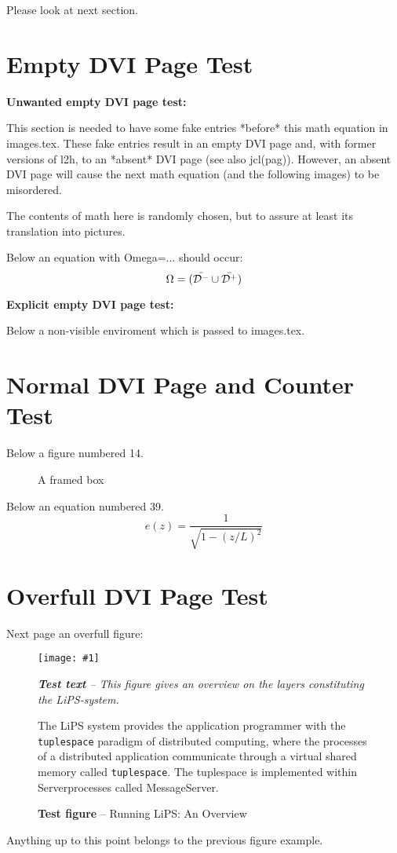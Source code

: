 \documentclass[12pt]{article}
\newcommand{\postscript}[3]{\begin{figure}[ht]%
  \begin{center}\texttt{[image: \#1]}\leavevmode
  \caption{#2}\label{#1}{\em #3}\end{center}\end{figure}}
\begin{document}
Please look at next section.

\section{Empty DVI Page Test}

{\bf Unwanted empty DVI page test:}

This section is needed to have some fake entries *before*
this math equation in images.tex. These fake entries result in an
empty DVI page and, with former versions of l2h, to an *absent*
DVI page (see also jcl(pag)).
However, an absent DVI page will cause the next math equation
(and the following images) to be misordered.

The contents of math here is randomly chosen, but to assure at
least its translation into pictures.

Below an equation with Omega=... should occur:
$$\Omega=(\bar{{\cal D}^-}\cup\bar{{\cal D}^+})$$

{\bf Explicit empty DVI page test:}

Below a non-visible enviroment which is passed to images.tex.

\begin{figure}\null\end{figure}


\section{Normal DVI Page and Counter Test}

Below a figure numbered 14.
\setcounter{figure}{13}
\setcounter{equation}{38}

\begin{figure}[hb]
\begin{center}
\end{center}\caption{A framed box}
\end{figure}

Below an equation numbered 39.
\begin{equation}
e(z)=\frac{1}{\sqrt{1-(z/L)^2}}
\end{equation}

\section{Overfull DVI Page Test}

Next page an overfull figure:

\clearpage
\postscript{pages1}{{\bf Test figure} -- Running LiPS: An Overview}
{{\bf Test text} --
This figure gives an overview on the layers constituting the LiPS-system.

The LiPS system provides the application programmer with the 
{\tt tuplespace} paradigm of distributed 
computing, where the processes of a distributed application communicate
through a virtual shared memory called {\tt tuplespace}.
The tuplespace is implemented within Serverprocesses called MessageServer.
}
\clearpage
Anything up to this point belongs to the previous figure example.
\end{document}
